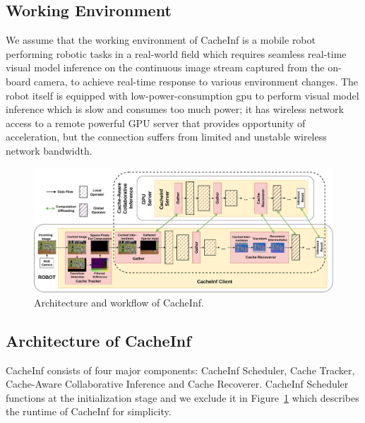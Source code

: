 
\subsection{Working Environment}
We assume that the working environment of CacheInf is a mobile robot performing robotic tasks in a real-world field which requires seamless real-time visual model inference on the continuous image stream captured from the on-board camera, to achieve real-time response to various environment changes.
The robot itself is equipped with low-power-consumption gpu to perform visual model inference which is slow and consumes too much power; it has wireless network access to a remote powerful GPU server that provides opportunity of acceleration, but the connection suffers from limited and unstable wireless network bandwidth.


\begin{figure}[!htb]
    \centering
    \vspace{-0.2cm}
    \includegraphics[width=0.98\linewidth]{fig/overview_new.drawio.pdf}
    \vspace{-0.2cm}
    \caption[track]{Architecture and workflow of CacheInf.}
    \label{fig:overview}
    \vspace{-0.3cm}
\end{figure}

\subsection{Architecture of CacheInf}
CacheInf consists of four major components: CacheInf Scheduler, Cache Tracker, Cache-Aware Collaborative Inference and Cache Recoverer.
CacheInf Scheduler functions at the initialization stage and we exclude it in Figure~\ref{fig:overview} which describes the runtime of CacheInf for simplicity.

